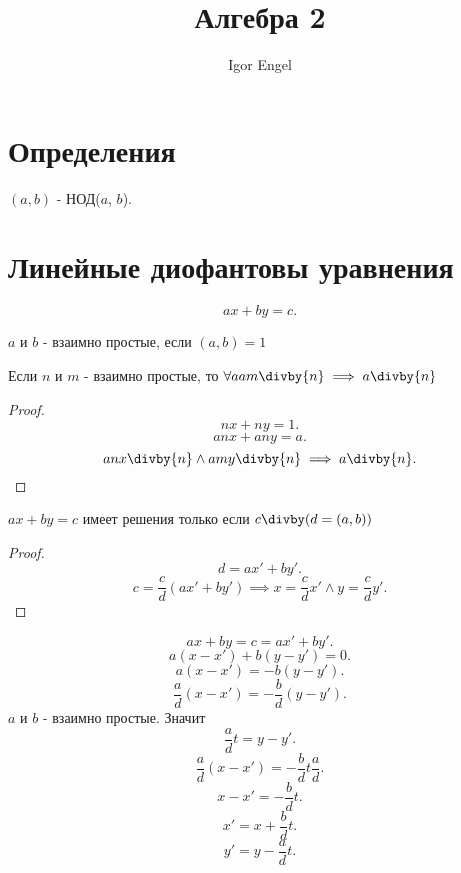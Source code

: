\documentclass[11pt, oneside]{article}   	%
\title{Алгебра 2}
\author{Igor Engel}
\date{}
\begin{document}
\maketitle
\section{Определения} 
    $\left( a,b \right)$ - НОД($a$,  $b$).
\section{Линейные диофантовы уравнения}
     \[ ax+by=c .\]
    \begin{definition}
        $a$ и  $b$ - взаимно простые, если  $\left( a, b \right) = 1$
    \end{definition}    
    \begin{dlemma}
        Если $n$ и  $m$ - взаимно простые, то $\forall{a} am\divby{n} \implies a\divby{n}$ 
        \begin{proof}
            \[ nx+ny=1 .\]
            \[ anx+any=a .\]
            \[ anx\divby{n}\land amy\divby{n} \implies a\divby{n} .\] 
        \end{proof}
    \end{dlemma}
    \begin{theorem}
        $ax+by=c$ имеет решения только если  $c\divby(d=\left( a,b \right))$
        \begin{proof}
            \[ d = ax'+by'.\] 
            \[ c=\frac{c}{d}\left( ax'+by' \right) \implies x=\frac{c}{d}x'\land y=\frac{c}{d}y'  .\] 
        \end{proof}
    \end{theorem}
    \[ ax+by=c=ax'+by' .\]
    \[ a(x-x')+b(y-y')=0 .\]
    \[ a(x-x')=-b(y-y') .\]
    \[ \frac{a}{d}(x-x')=-\frac{b}{d}(y-y') .\]
     $a$ и  $b$ - взаимно простые. Значит
     \[ \frac{a}{d}t = y-y' .\]
     \[ \frac{a}{d}(x-x')=-\frac{b}{d}t\frac{a}{d} .\]
     \[ x-x'=-\frac{b}{d}t .\] 
     \[ x' = x+\frac{b}{d}t .\]
     \[ y' = y-\frac{a}{d}t .\]
\end{document}
